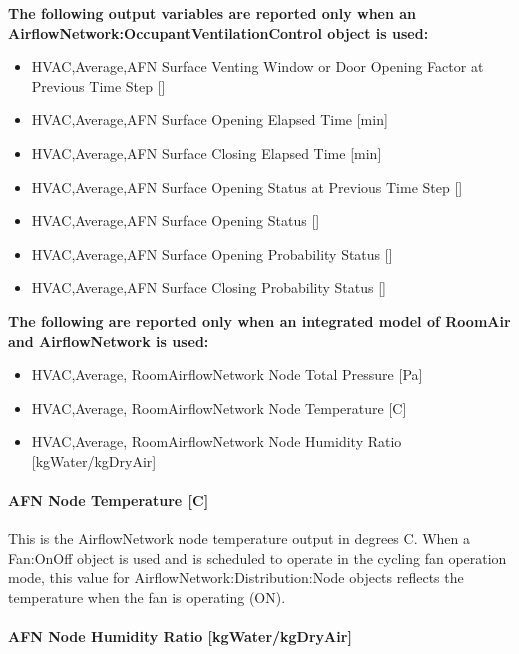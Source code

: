 \textbf{The following output variables are reported only when an AirflowNetwork:OccupantVentilationControl object is used:}

\begin{itemize}
\item
  HVAC,Average,AFN Surface Venting Window or Door Opening Factor at Previous Time Step {[]}
\item
  HVAC,Average,AFN Surface Opening Elapsed Time {[}min{]}
\item
  HVAC,Average,AFN Surface Closing Elapsed Time {[}min{]}
\item
  HVAC,Average,AFN Surface Opening Status at Previous Time Step {[]}
\item
  HVAC,Average,AFN Surface Opening Status {[]}
\item
  HVAC,Average,AFN Surface Opening Probability Status {[]}
\item
  HVAC,Average,AFN Surface Closing Probability Status {[]}
\end{itemize}

\textbf{The following are reported only when an integrated model of RoomAir and AirflowNetwork is used:}

\begin{itemize}
\item
  HVAC,Average, RoomAirflowNetwork Node Total Pressure {[}Pa{]}
\item
  HVAC,Average, RoomAirflowNetwork Node Temperature {[}C{]}
\item
  HVAC,Average, RoomAirflowNetwork Node Humidity Ratio {[}kgWater/kgDryAir{]}
\end{itemize}

\paragraph{AFN Node Temperature {[}C{]}}\label{afn-node-temperature-c}

This is the AirflowNetwork node temperature output in degrees C. When a Fan:OnOff object is used and is scheduled to operate in the cycling fan operation mode, this value for AirflowNetwork:Distribution:Node objects reflects the temperature when the fan is operating (ON).

\paragraph{AFN Node Humidity Ratio {[}kgWater/kgDryAir{]}}\label{afn-node-humidity-ratio-kgwaterkgdryair}

